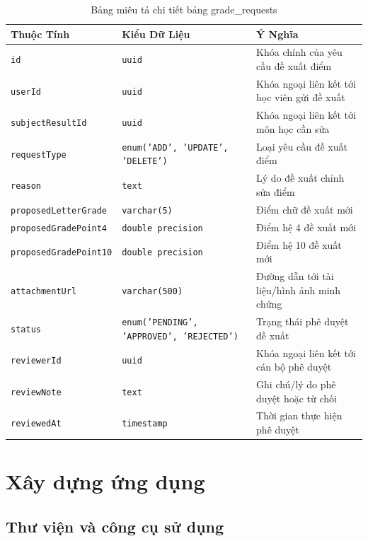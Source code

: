\documentclass[../DoAn.tex]{subfiles}
\begin{document}
\begin{table}[H]
\centering
\small
\renewcommand{\arraystretch}{1.2}
\begin{tabular}{|l|p{4.5cm}|p{7.5cm}|}
\hline
\textbf{Thuộc Tính} & \textbf{Kiểu Dữ Liệu} & \textbf{Ý Nghĩa} \\ \hline
\texttt{id} & \texttt{uuid} & Khóa chính của yêu cầu đề xuất điểm \\ \hline
\texttt{userId} & \texttt{uuid} & Khóa ngoại liên kết tới học viên gửi đề xuất \\ \hline
\texttt{subjectResultId} & \texttt{uuid} & Khóa ngoại liên kết tới môn học cần sửa \\ \hline
\texttt{requestType} & \texttt{enum('ADD', 'UPDATE', 'DELETE')} & Loại yêu cầu đề xuất điểm \\ \hline
\texttt{reason} & \texttt{text} & Lý do đề xuất chỉnh sửa điểm \\ \hline
\texttt{proposedLetterGrade} & \texttt{varchar(5)} & Điểm chữ đề xuất mới \\ \hline
\texttt{proposedGradePoint4} & \texttt{double precision} & Điểm hệ 4 đề xuất mới \\ \hline
\texttt{proposedGradePoint10} & \texttt{double precision} & Điểm hệ 10 đề xuất mới \\ \hline
\texttt{attachmentUrl} & \texttt{varchar(500)} & Đường dẫn tới tài liệu/hình ảnh minh chứng \\ \hline
\texttt{status} & \texttt{enum('PENDING', 'APPROVED', 'REJECTED')} & Trạng thái phê duyệt đề xuất \\ \hline
\texttt{reviewerId} & \texttt{uuid} & Khóa ngoại liên kết tới cán bộ phê duyệt \\ \hline
\texttt{reviewNote} & \texttt{text} & Ghi chú/lý do phê duyệt hoặc từ chối \\ \hline
\texttt{reviewedAt} & \texttt{timestamp} & Thời gian thực hiện phê duyệt \\ \hline
\end{tabular}
\caption{Bảng miêu tả chi tiết bảng grade\_requests}
\label{tab:grade_requests_details}
\end{table}


\section{Xây dựng ứng dụng}
\subsection{Thư viện và công cụ sử dụng}
\end{document}
